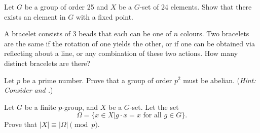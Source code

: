 \begin{problem}
    Let $G$ be a group of order 25 and $X$ be a $G$-set of 24 elements. Show that there exists an element in $G$ with a fixed point.
\end{problem}

\begin{problem}
    A bracelet consists of 3 beads that each can be one of $n$ colours. Two bracelets are the same if the rotation of one yields the other, or if one can be obtained via reflecting about a line, or any combination of these two actions. How many distinct bracelets are there?
\end{problem}

\begin{problem}\label{problem-group-of-order-prime-squared-is-abelian}
    Let $p$ be a prime number. Prove that a group of order $p^2$ must be abelian.\newline
    (\textit{Hint: Consider  and .})
\end{problem}

\begin{problem}
    Let $G$ be a finite $p$-group, and $X$ be a $G$-set. Let the set
    \[
        \Omega = \{x \in X \vert g\cdot x = x \textrm{ for all } g \in G\}.
    \]
    Prove that $|X| \equiv |\Omega| \pmod p$.
\end{problem}
